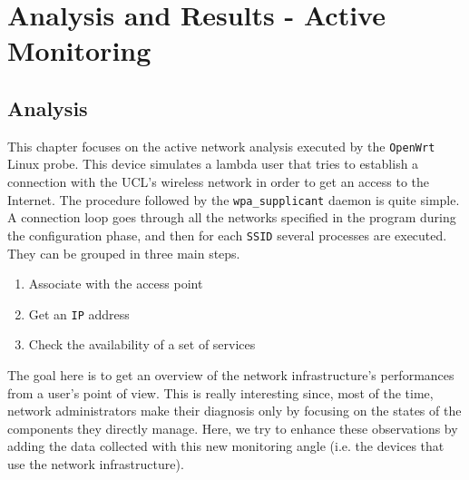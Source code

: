 
\chapter{Analysis and Results - Active Monitoring} %

\label{Chapter6} %





\section{Analysis}
This chapter focuses on the active network analysis executed by the \texttt{OpenWrt} Linux probe. This device simulates a lambda user that tries to establish a connection with the UCL's wireless network in order to get an access to the Internet. The procedure followed by the \texttt{wpa\_supplicant} daemon is quite simple. A connection loop goes through all the networks specified in the program during the configuration phase, and then for each \texttt{SSID} several processes are executed. They can be grouped in three main steps.

\begin{enumerate}
\item Associate with the access point
\item Get an \texttt{IP} address
\item Check the availability of a set of services
\end{enumerate}

The goal here is to get an overview of the network infrastructure's performances from a user's point of view. This is really interesting since, most of the time, network administrators make their diagnosis only by focusing on the states of the components they directly manage. Here, we try to enhance these observations by adding the data collected with this new monitoring angle (i.e. the devices that use the network infrastructure).

